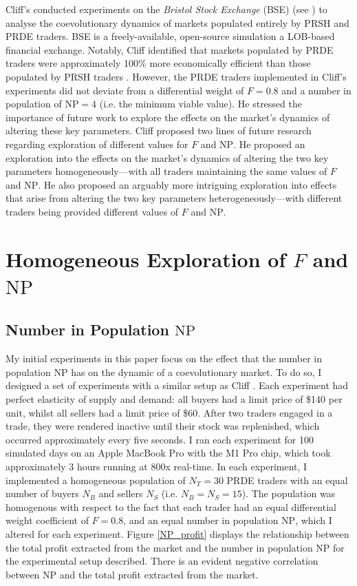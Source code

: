 \documentclass[conference]{IEEEtran}
\begin{document}
Cliff's conducted experiments on the \textit{Bristol Stock Exchange} (BSE) (see \cite{BSE, BSEPaper}) to analyse the coevolutionary dynamics of markets populated entirely by PRSH and PRDE traders.
BSE is a freely-available, open-source simulation a LOB-based financial exchange.
Notably, Cliff identified that markets populated by PRDE traders were approximately 100\% more economically efficient than those populated by PRSH traders \cite{PRDE}.
However, the PRDE traders implemented in Cliff's experiments did not deviate from a differential weight of $F=0.8$ and a number in population of $\mathrm{NP}=4$ (i.e. the minimum viable value).
He stressed the importance of future work to explore the effects on the market's dynamics of altering these key parameters.
Cliff proposed two lines of future research regarding exploration of different values for $F$ and $\mathrm{NP}$.
He proposed an exploration into the effects on the market's dynamics of altering the two key parameters homogeneously---with all traders maintaining the same values of $F$ and $\mathrm{NP}$.
He also proposed an arguably more intriguing exploration into effects that arise from altering the two key parameters heterogeneously---with different traders being provided different values of $F$ and $\mathrm{NP}$.

\section{Homogeneous Exploration of $F$ and $\mathrm{NP}$}

\subsection{Number in Population $\mathrm{NP}$}

My initial experiments in this paper focus on the effect that the number in population $\mathrm{NP}$ has on the dynamic of a coevolutionary market.
To do so, I designed a set of experiments with a similar setup as Cliff \cite{PRDE}.
Each experiment had perfect elasticity of supply and demand: all buyers had a limit price of \$140 per unit, whilst all sellers had a limit price of \$60.
After two traders engaged in a trade, they were rendered inactive until their stock was replenished, which occurred approximately every five seconds.
I ran each experiment for 100 simulated days on an Apple MacBook Pro with the M1 Pro chip, which took approximately 3 hours running at 800x real-time.
In each experiment, I implemented a homogeneous population of $N_T=30$ PRDE traders with an equal number of buyers $N_B$ and sellers $N_S$ (i.e. $N_B=N_S=15$).
The population was homogenous with respect to the fact that each trader had an equal differential weight coefficient of $F=0.8$, and an equal number in population $\mathrm{NP}$, which I altered for each experiment.
Figure \ref{NP_profit} displays the relationship between the total profit extracted from the market and the number in population $\mathrm{NP}$ for the experimental setup described.
There is an evident negative correlation between $\mathrm{NP}$ and the total profit extracted from the market.
\end{document}
